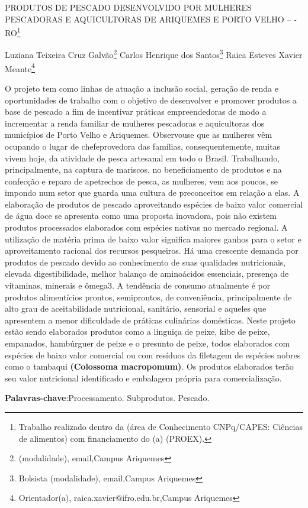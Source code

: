 \documentclass[article,12pt,onesidea,4paper,english,brazil]{abntex2}
\begin{document}
	
	
	\frenchspacing 
	
	\begin{center}
		\LARGE PRODUTOS DE PESCADO DESENVOLVIDO POR MULHERES PESCADORAS E AQUICULTORAS DE ARIQUEMES E PORTO VELHO -- ­RO\footnote{Trabalho realizado dentro da (área de Conhecimento CNPq/CAPES: Ciências de alimentos) com financiamento do (a) (PROEX).}
		
		\normalsize
		Luziana Teixeira Cruz Galvão\footnote{(modalidade), email,Campus Ariquemes} 
		Carlos Henrique dos Santos\footnote{Bolsista (modalidade), email,Campus Ariquemes} 
		Raica Esteves Xavier Meante\footnote{Orientador(a), raica.xavier@ifro.edu.br,Campus Ariquemes}  
	\end{center}
	
	\noindent O projeto tem como linhas de atuação a inclusão social, geração de renda e oportunidades de trabalho com o objetivo de desenvolver e promover produtos a base de pescado a fim de incentivar práticas empreendedoras de modo a incrementar a renda familiar de mulheres pescadoras e aquicultoras dos municípios de Porto Velho e Ariquemes. Observou­se que as mulheres vêm ocupando o lugar de chefe­provedora das famílias, consequentemente, muitas vivem hoje, da atividade de pesca artesanal em todo o Brasil. Trabalhando, principalmente, na captura de mariscos, no beneficiamento de produtos e na confecção e reparo de apetrechos de pesca, as mulheres, vem aos poucos, se impondo num setor que guarda uma cultura de preconceitos em relação a elas. A elaboração de produtos de pescado aproveitando espécies de baixo valor comercial de água doce se apresenta como uma proposta inovadora, pois não existem produtos processados elaborados com espécies nativas no mercado regional. A utilização de matéria prima de baixo valor significa maiores ganhos para o setor e aproveitamento racional dos recursos pesqueiros. Há uma crescente demanda por produtos de pescado devido ao conhecimento de suas qualidades nutricionais, elevada digestibilidade, melhor balanço de aminoácidos essenciais, presença de vitaminas, minerais e ômega­3. A tendência de consumo atualmente é por produtos alimentícios prontos, semiprontos, de conveniência, principalmente de alto grau de aceitabilidade nutricional, sanitário, sensorial e aqueles que apresentem a menor dificuldade de práticas culinárias domésticas. Neste projeto estão sendo elaborados produtos como a linguiça de peixe, kibe de peixe, empanados, hambúrguer de peixe e o presunto de peixe, todos elaborados com espécies de baixo valor comercial ou com resíduos da filetagem de espécies nobres como o tambaqui \textbf{(Colossoma macropomum)}. Os produtos elaborados terão seu valor nutricional identificado e embalagem própria para comercialização.
	
	\vspace{\onelineskip}
	
	\noindent
	\textbf{Palavras-chave}:Processamento. Subprodutos. Pescado.
	
\end{document}
